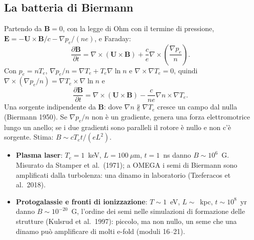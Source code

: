 \subsection{La batteria di Biermann}
Partendo da $\mathbf{B}=0$, con la legge di Ohm con il termine di pressione, $\mathbf{E}=-\mathbf{U}\times\mathbf{B}/c-\nabla p_e/(ne)$, e Faraday:
\begin{equation}
\frac{\partial\mathbf{B}}{\partial t}=\nabla\times(\mathbf{U}\times\mathbf{B})+\frac ce\nabla\times\left(\frac{\nabla p_e}{n}\right).
\end{equation}
Con $p_e=nT_e$, $\nabla p_e/n=\nabla T_e+T_e\nabla\ln n$ e $\nabla\times\nabla T_e=0$, quindi $\nabla\times(\nabla p_e/n)=\nabla T_e\times\nabla\ln n$ e
\begin{equation}
\frac{\partial\mathbf{B}}{\partial t}=\nabla\times(\mathbf{U}\times\mathbf{B})-\frac{c}{ne}\nabla n\times\nabla T_e .
\end{equation}
Una sorgente indipendente da $\mathbf{B}$: dove $\nabla n\nparallel\nabla T_e$ cresce un campo dal nulla (Biermann 1950). Se $\nabla p_e/n$ non è un gradiente, genera una forza elettromotrice lungo un anello; se i due gradienti sono paralleli il rotore è nullo e non c'è sorgente. Stima: $B\sim cT_et/(eL^2)$.
\begin{itemize}
\item \textbf{Plasma laser}: $T_e=1$~keV, $L=100~\mu$m, $t=1$~ns danno $B\sim10^6$~G. Misurato da Stamper et al.~(1971); a OMEGA i semi di Biermann sono amplificati dalla turbolenza: una dinamo in laboratorio (Tzeferacos et al.~2018).
\item \textbf{Protogalassie e fronti di ionizzazione}: $T\sim1$~eV, $L\sim$~kpc, $t\sim10^8$~yr danno $B\sim10^{-20}$~G, l'ordine dei semi nelle simulazioni di formazione delle strutture (Kulsrud et al.~1997): piccolo, ma non nullo, un seme che una dinamo può amplificare di molti e-fold (moduli 16--21).
\end{itemize}

